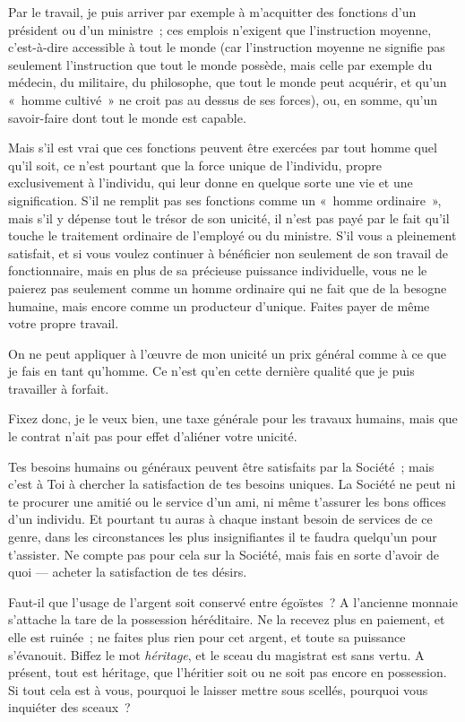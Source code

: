 \documentclass[french,twoside]{book} %
\begin{document}
Par le travail, je puis arriver par exemple à m’acquitter des fonctions d’un président ou d’un ministre ; ces emplois n’exigent que l’instruction moyenne, c’est-à-dire accessible à tout le monde (car l’instruction moyenne ne signifie pas seulement l’instruction que tout le monde possède, mais celle par exemple du médecin, du militaire, du philosophe, que tout le monde peut acquérir, et qu’un « homme cultivé » ne croit pas au dessus de ses forces), ou, en somme, qu’un savoir-faire dont tout le monde est capable.\par
Mais s’il est vrai que ces fonctions peuvent être exercées par tout homme quel qu’il soit, ce n’est pourtant que la force unique de l’individu, propre exclusivement à l’individu, qui leur donne en quelque sorte une vie et une signification. S’il ne remplit pas ses fonctions comme un « homme ordinaire », mais s’il y dépense tout le trésor de son unicité, il  n’est pas payé par le fait qu’il touche le traitement ordinaire de l’employé ou du ministre. S’il vous a pleinement satisfait, et si vous voulez continuer à bénéficier non seulement de son travail de fonctionnaire, mais en plus de sa précieuse puissance individuelle, vous ne le paierez pas seulement comme un homme ordinaire qui ne fait que de la besogne humaine, mais encore comme un producteur d’unique. Faites payer de même votre propre travail.\par
On ne peut appliquer à l’œuvre de mon unicité un prix général comme à ce que je fais en tant qu’homme. Ce n’est qu’en cette dernière qualité que je puis travailler à forfait.\par
Fixez donc, je le veux bien, une taxe générale pour les travaux humains, mais que le contrat n’ait pas pour effet d’aliéner votre unicité.\par
Tes besoins humains ou généraux peuvent être satisfaits par la Société ; mais c’est à Toi à chercher la satisfaction de tes besoins uniques. La Société ne peut ni te procurer une amitié ou le service d’un ami, ni même t’assurer les bons offices d’un individu. Et pourtant tu auras à chaque instant besoin de services de ce genre, dans les circonstances les plus insignifiantes il te faudra quelqu’un pour t’assister. Ne compte pas pour cela sur la Société, mais fais en sorte d’avoir de quoi — acheter la satisfaction de tes désirs.\par
Faut-il que l’usage de l’argent soit conservé entre égoïstes ? A l’ancienne monnaie s’attache la tare de la possession héréditaire. Ne la recevez plus en paiement, et elle est ruinée ; ne faites plus rien pour cet argent, et toute sa puissance s’évanouit. Biffez le mot \emph{héritage}, et le sceau du magistrat est sans vertu. A présent, tout est héritage, que l’héritier soit ou ne soit pas encore en possession. Si tout cela est à vous, pourquoi le laisser mettre sous scellés, pourquoi vous inquiéter des sceaux ?\par
\end{document}
